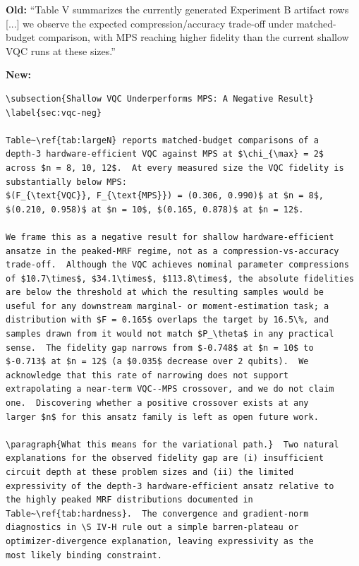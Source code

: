 \textbf{Old:} ``Table V summarizes the currently generated Experiment B
artifact rows [...] we observe the expected compression/accuracy trade-off
under matched-budget comparison, with MPS reaching higher fidelity than the
current shallow VQC runs at these sizes.''

\noindent\textbf{New:}

\begin{verbatim}
\subsection{Shallow VQC Underperforms MPS: A Negative Result}
\label{sec:vqc-neg}

Table~\ref{tab:largeN} reports matched-budget comparisons of a
depth-3 hardware-efficient VQC against MPS at $\chi_{\max} = 2$
across $n = 8, 10, 12$.  At every measured size the VQC fidelity is
substantially below MPS:
$(F_{\text{VQC}}, F_{\text{MPS}}) = (0.306, 0.990)$ at $n = 8$,
$(0.210, 0.958)$ at $n = 10$, $(0.165, 0.878)$ at $n = 12$.

We frame this as a negative result for shallow hardware-efficient
ansatze in the peaked-MRF regime, not as a compression-vs-accuracy
trade-off.  Although the VQC achieves nominal parameter compressions
of $10.7\times$, $34.1\times$, $113.8\times$, the absolute fidelities
are below the threshold at which the resulting samples would be
useful for any downstream marginal- or moment-estimation task; a
distribution with $F = 0.165$ overlaps the target by 16.5\%, and
samples drawn from it would not match $P_\theta$ in any practical
sense.  The fidelity gap narrows from $-0.748$ at $n = 10$ to
$-0.713$ at $n = 12$ (a $0.035$ decrease over 2 qubits).  We
acknowledge that this rate of narrowing does not support
extrapolating a near-term VQC--MPS crossover, and we do not claim
one.  Discovering whether a positive crossover exists at any
larger $n$ for this ansatz family is left as open future work.

\paragraph{What this means for the variational path.}  Two natural
explanations for the observed fidelity gap are (i) insufficient
circuit depth at these problem sizes and (ii) the limited
expressivity of the depth-3 hardware-efficient ansatz relative to
the highly peaked MRF distributions documented in
Table~\ref{tab:hardness}.  The convergence and gradient-norm
diagnostics in \S IV-H rule out a simple barren-plateau or
optimizer-divergence explanation, leaving expressivity as the
most likely binding constraint.
\end{verbatim}

